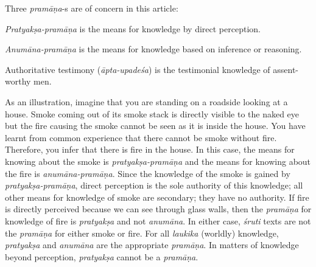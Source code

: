 Three {\sl pramāṇa}-s are of concern in this article:
\begin{myquote}
{\sl Pratyakṣa-pramāṇa} is the means for knowledge by direct perception. 

{\sl Anumāna-pramāṇa} is the means for knowledge based on inference or reasoning.  

Authoritative testimony ({\sl āpta-upadeśa}) is the testimonial knowledge of assent-worthy men.
\end{myquote}

As an illustration, imagine that you are standing on a roadside looking at a house. Smoke coming out of its smoke stack is directly visible to the naked eye but the fire causing the smoke cannot be seen as it is inside the house.  You have learnt from common experience that there cannot be smoke without fire.  Therefore, you infer that there is fire in the house.  In this case, the means for knowing about the smoke is {\sl pratyakṣa-pramāṇa} and the means for knowing about the fire is {\sl anumāna-pramāṇa}.  Since the knowledge of the smoke is gained by {\sl pratyakṣa-pramāṇa}, direct perception is the sole authority of this knowledge; all other means for knowledge of smoke are secondary; they have no authority.  If fire is directly perceived because we can see through glass walls, then the {\sl pramāṇa} for knowledge of fire is {\sl pratyakṣa} and not {\sl anumāna}.  In either case, {\sl śruti} texts are not the {\sl pramāṇa} for either smoke or fire.  For all {\sl laukika} (worldly) knowledge, {\sl pratyakṣa} and {\sl anumāna} are the appropriate {\sl pramāṇa}. In matters of knowledge beyond perception, {\sl pratyakṣa} cannot be a {\sl pramāṇa}.

